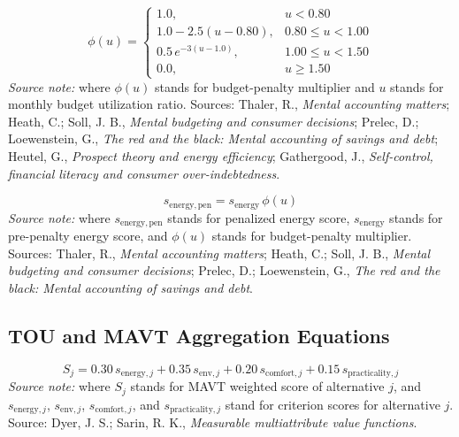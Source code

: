 \documentclass[12pt]{article}
\begin{document}
\begin{equation}
\label{eq:budget_penalty}
\phi(u)=
\begin{cases}
1.0, & u<0.80\\
1.0-2.5(u-0.80), & 0.80\le u<1.00\\
0.5\,e^{-3(u-1.0)}, & 1.00\le u<1.50\\
0.0, & u\ge 1.50
\end{cases}
\end{equation}
\noindent\textit{Source note:} where $\phi(u)$ stands for budget-penalty multiplier and $u$ stands for monthly budget utilization ratio. Sources: Thaler, R., \emph{Mental accounting matters}; Heath, C.; Soll, J. B., \emph{Mental budgeting and consumer decisions}; Prelec, D.; Loewenstein, G., \emph{The red and the black: Mental accounting of savings and debt}; Heutel, G., \emph{Prospect theory and energy efficiency}; Gathergood, J., \emph{Self-control, financial literacy and consumer over-indebtedness}.

\begin{equation}
\label{eq:penalized_energy_score}
s_{\mathrm{energy,pen}} = s_{\mathrm{energy}}\,\phi(u)
\end{equation}
\noindent\textit{Source note:} where $s_{\mathrm{energy,pen}}$ stands for penalized energy score, $s_{\mathrm{energy}}$ stands for pre-penalty energy score, and $\phi(u)$ stands for budget-penalty multiplier. Sources: Thaler, R., \emph{Mental accounting matters}; Heath, C.; Soll, J. B., \emph{Mental budgeting and consumer decisions}; Prelec, D.; Loewenstein, G., \emph{The red and the black: Mental accounting of savings and debt}.

\subsection{TOU and MAVT Aggregation Equations}

\begin{equation}
\label{eq:mavt_weighted_sum_appendix}
S_j = 0.30\,s_{\mathrm{energy},j} + 0.35\,s_{\mathrm{env},j} + 0.20\,s_{\mathrm{comfort},j} + 0.15\,s_{\mathrm{practicality},j}
\end{equation}
\noindent\textit{Source note:} where $S_j$ stands for MAVT weighted score of alternative $j$, and $s_{\mathrm{energy},j}$, $s_{\mathrm{env},j}$, $s_{\mathrm{comfort},j}$, and $s_{\mathrm{practicality},j}$ stand for criterion scores for alternative $j$. Source: Dyer, J. S.; Sarin, R. K., \emph{Measurable multiattribute value functions}.
\end{document}
